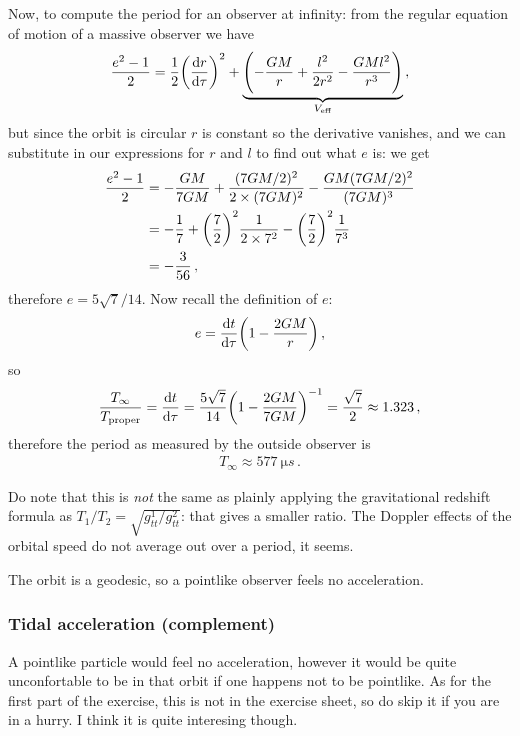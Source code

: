 \documentclass[main.tex]{subfiles}
\begin{document}
Now, to compute the period for an observer at infinity: from the regular equation of motion of a massive observer we have 
%
\begin{align}
  \frac{e^2-1}{2} = \frac{1}{2} \qty(\dv{r}{\tau })^2+ \underbrace{\qty(-\frac{GM}{r} + \frac{l^2}{2r^2} - \frac{GMl^2}{r^3})}_{V _{\text{eff}}}
\,,
\end{align}
%
but since the orbit is circular \(r\) is constant so the derivative vanishes, and we can substitute in our expressions for \(r\) and \(l\) to find out what \(e\) is: we get 
%
\begin{align}
  \frac{e^2-1}{2} &= - \frac{GM}{7GM} + \frac{(7GM/2)^2}{2\times (7GM)^2} - \frac{GM (7GM/2)^2}{(7GM)^3}  \\
&= - \frac{1}{7}+ \qty(\frac{7}{2})^2 \frac{1}{2\times 7^2} - \qty(\frac{7}{2})^2 \frac{1}{7^3}  \\
&= -\frac{3}{56}
\,,
\end{align}
%
therefore \(e = 5 \sqrt{7} / 14\). Now recall the definition of \(e\): 
%
\begin{align}
  e = \dv{t}{\tau } \qty(1 - \frac{2GM}{r}) 
\,,
\end{align}
%
so 
%
\begin{align}
  \frac{T_{ \infty }}{T _{\text{proper}}} = 
  \dv{t}{\tau } = \frac{5 \sqrt{7}}{14} \qty(1 - \frac{2GM}{7GM})^{-1} = \frac{\sqrt{7}}{2} \approx 1.323 
\,,
\end{align}
%
therefore the period as measured by the outside observer is 
%
\begin{align}
  T_{ \infty } \approx \SI{577}{\micro s}
\,.
\end{align}
%

Do note that this is \emph{not} the same as plainly applying the gravitational redshift formula as \(T_1 / T_2 = \sqrt{ g_{tt}^{1}/ g_{tt}^{2}}\): that gives a smaller ratio. The Doppler effects of the orbital speed do not average out over a period, it seems. 

The orbit is a geodesic, so a pointlike observer feels no acceleration. 

\subsubsection{Tidal acceleration (complement)}

A pointlike particle would feel no acceleration, however it would be quite unconfortable to be in that orbit if one happens not to be pointlike. 
As for the first part of the exercise, this is not in the exercise sheet, so do skip it if you are in a hurry. I think it is quite interesing though.
\end{document}
